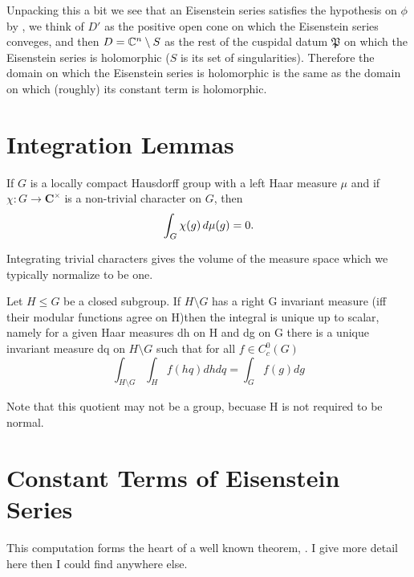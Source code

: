     Unpacking this a bit we see that an Eisenstein series satisfies the hypothesis on \(\phi\) by \cite[IV.1.9]{moeglinSpectralDecompositionEisenstein1995} , we think of \(D'\) as the positive open cone on which the Eisenstein series conveges, and then \(D = \C^n \setminus S \) as the rest of the cuspidal datum \(\mathfrak{P}\) on which the Eisenstein series is holomorphic (\(S\) is its set of singularities). Therefore the domain on which the Eisenstein series is holomorphic is the same as the domain on which (roughly) its constant term is holomorphic.

\section{Integration Lemmas}
\begin{Theorem}
	If \(G\) is a locally compact Hausdorff group with a left Haar measure \(\mu\) and if \(\chi\colon G\to \mathbf C^\times\) is a non-trivial character on \(G\), then
	\[ \int^{}_{G}\chi(g)\,d\mu(g) = 0. \]
\end{Theorem}
    Integrating trivial characters gives the volume of the measure space which we typically normalize to be one.

\begin{Theorem}
        Let \(H\leq G\) be a closed subgroup. If \(H\setminus G\) has a right G invariant measure (iff their modular functions agree on H)then the integral is unique up to scalar, namely for a given Haar measures dh on H and dg on G there is a unique invariant measure dq on \(H\setminus G\) such that for all \(f\in C_c^0(G)\)
        \[\int_{H\setminus G}\int_H f(hq)dhdq = \int_G f(g) dg\]
    \end{Theorem}
    Note that this quotient may not be a group, becuase H is not required to be normal.

\section{Constant Terms of Eisenstein Series}
This computation forms the heart of a well known theorem, \cite[Prop 10.4.2]{getzIntroductionAutomorphicRepresentations2024}\cite[II.1.7]{moeglinSpectralDecompositionEisenstein1995}\cite[6.2]{shahidiEisensteinSeriesAutomorphic2010}. I give more detail here then I could find anywhere else. 

